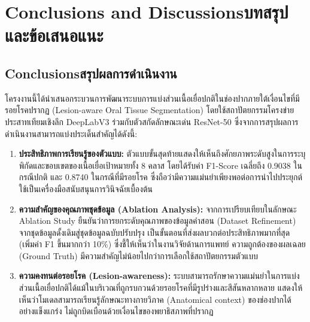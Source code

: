 \chapter{\ifenglish Conclusions and Discussions\else บทสรุปและข้อเสนอแนะ\fi}

\section{\ifenglish Conclusions\else สรุปผลการดำเนินงาน\fi}
โครงงานนี้ได้นำเสนอกระบวนการพัฒนาระบบการแบ่งส่วนเนื้อเยื่อปกติในช่องปากภายใต้เงื่อนไขที่มีรอยโรคปรากฏ (Lesion-aware Oral Tissue Segmentation) โดยใช้สถาปัตยกรรมโครงข่ายประสาทเทียมเชิงลึก DeepLabV3 ร่วมกับตัวสกัดลักษณะเด่น ResNet-50 ซึ่งจากการสรุปผลการดำเนินงานสามารถแบ่งประเด็นสำคัญได้ดังนี้:

\begin{enumerate}
    \item \textbf{ประสิทธิภาพการเรียนรู้ของตัวแบบ:} ตัวแบบขั้นสุดท้ายแสดงให้เห็นถึงศักยภาพระดับสูงในการระบุพิกัดและขอบเขตของเนื้อเยื่อเป้าหมายทั้ง 8 คลาส โดยได้รับค่า F1-Score เฉลี่ยถึง 0.9038 ในกรณีปกติ และ 0.8740 ในกรณีที่มีรอยโรค ซึ่งถือว่ามีความแม่นยำเพียงพอต่อการนำไปประยุกต์ใช้เป็นเครื่องมือสนับสนุนการวินิจฉัยเบื้องต้น
    \item \textbf{ความสำคัญของคุณภาพชุดข้อมูล (Ablation Analysis):} จากการเปรียบเทียบในลักษณะ Ablation Study ยืนยันว่าการยกระดับคุณภาพของข้อมูลคำสอน (Dataset Refinement) จากชุดข้อมูลดั้งเดิมสู่ชุดข้อมูลฉบับปรับปรุง เป็นขั้นตอนที่ส่งผลบวกต่อประสิทธิภาพมากที่สุด (เพิ่มค่า F1 ขึ้นมากกว่า 10\%) ซึ่งชี้ให้เห็นว่าในงานวิจัยด้านการแพทย์ ความถูกต้องของผลเฉลย (Ground Truth) มีความสำคัญไม่น้อยไปกว่าการเลือกใช้สถาปัตยกรรมตัวแบบ
    \item \textbf{ความคงทนต่อรอยโรค (Lesion-awareness):} ระบบสามารถรักษาความแม่นยำในการแบ่งส่วนเนื้อเยื่อปกติได้แม้ในบริเวณที่ถูกรบกวนด้วยรอยโรคที่มีรูปร่างและสีสันหลากหลาย แสดงให้เห็นว่าโมเดลสามารถเรียนรู้ลักษณะทางกายวิภาค (Anatomical context) ของช่องปากได้อย่างแข็งแกร่ง ไม่ถูกบิดเบือนด้วยเงื่อนไขของพยาธิสภาพที่ปรากฏ
\end{enumerate}

